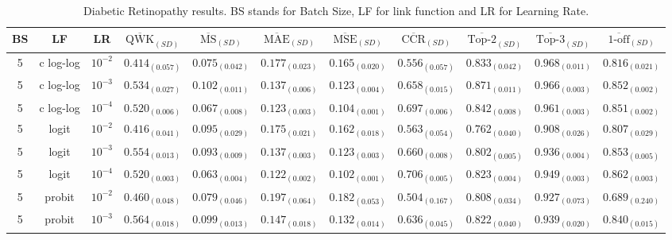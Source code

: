 \documentclass[journal]{IEEEtran}
\begin{document}
	\begin{table*}[!t]
		\caption{Diabetic Retinopathy results. BS stands for Batch Size, LF for link function and LR for Learning Rate.}
		\label{table:DRresults}
		\footnotesize
		\centering
		\begin{tabular}{c@{\hskip 0.15cm}c@{\hskip 0.15cm}c|c@{\hskip 0.30cm}c@{\hskip 0.20cm}c@{\hskip 0.20cm}c@{\hskip 0.20cm}c@{\hskip 0.20cm}c@{\hskip 0.20cm}c@{\hskip 0.20cm}c}
			BS & LF & LR & $\overline{\text{QWK}}_{{(SD)}}$ & $\overline{\text{MS}}_{{(SD)}}$ & $\overline{\text{MAE}}_{{(SD)}}$ & $\overline{\text{MSE}}_{{(SD)}}$ & $\overline{\text{CCR}}_{{(SD)}}$ & $\overline{\text{Top-2}}_{{(SD)}}$ & $\overline{\text{Top-3}}_{{(SD)}}$ & $\overline{\text{1-off}}_{{(SD)}}$\\\hline
			5 & c log-log & $10^{-2}$ & $0.414_{(0.057)}$ & $0.075_{(0.042)}$ & $0.177_{(0.023)}$ & $0.165_{(0.020)}$ & $0.556_{(0.057)}$ & $0.833_{(0.042)}$ & $0.968_{(0.011)}$ & $0.816_{(0.021)}$\\
			5 & c log-log & $10^{-3}$ & $0.534_{(0.027)}$ & $0.102_{(0.011)}$ & $0.137_{(0.006)}$ & $0.123_{(0.004)}$ & $0.658_{(0.015)}$ & $0.871_{(0.011)}$ & $0.966_{(0.003)}$ & $0.852_{(0.002)}$\\
			5 & c log-log & $10^{-4}$ & $0.520_{(0.006)}$ & $0.067_{(0.008)}$ & $0.123_{(0.003)}$ & $0.104_{(0.001)}$ & $0.697_{(0.006)}$ & $0.842_{(0.008)}$ & $0.961_{(0.003)}$ & $0.851_{(0.002)}$\\
			5 & logit & $10^{-2}$ & $0.416_{(0.041)}$ & $0.095_{(0.029)}$ & $0.175_{(0.021)}$ & $0.162_{(0.018)}$ & $0.563_{(0.054)}$ & $0.762_{(0.040)}$ & $0.908_{(0.026)}$ & $0.807_{(0.029)}$\\
			5 & logit & $10^{-3}$ & $0.554_{(0.013)}$ & $0.093_{(0.009)}$ & $0.137_{(0.003)}$ & $0.123_{(0.003)}$ & $0.660_{(0.008)}$ & $0.802_{(0.005)}$ & $0.936_{(0.004)}$ & $0.853_{(0.005)}$\\
			5 & logit & $10^{-4}$ & $0.520_{(0.003)}$ & $0.063_{(0.004)}$ & $0.122_{(0.002)}$ & $0.102_{(0.001)}$ & $0.706_{(0.005)}$ & $0.823_{(0.004)}$ & $0.949_{(0.003)}$ & $0.862_{(0.003)}$\\
			5 & probit & $10^{-2}$ & $0.460_{(0.048)}$ & $0.079_{(0.046)}$ & $0.197_{(0.064)}$ & $0.182_{(0.053)}$ & $0.504_{(0.167)}$ & $0.808_{(0.034)}$ & $0.927_{(0.073)}$ & $0.689_{(0.240)}$\\
			5 & probit & $10^{-3}$ & $0.564_{(0.018)}$ & $0.099_{(0.013)}$ & $0.147_{(0.018)}$ & $0.132_{(0.014)}$ & $0.636_{(0.045)}$ & $0.822_{(0.040)}$ & $0.939_{(0.020)}$ & $0.840_{(0.015)}$\\

\end{tabular}
\end{table*}
\end{document}
